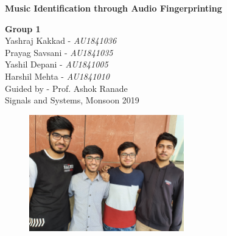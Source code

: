\begin{titlepage}
    \begin{center}
        \vspace*{1cm}
        
        \Huge
        \textbf{Music Identification through Audio Fingerprinting}
        
        \vspace{1cm}
        \LARGE
        \textbf{Group 1} \\
        \vspace*{3mm}
        Yashraj Kakkad - \textit{AU1841036} \\ 
        Prayag Savsani - \textit{AU1841035} \\
        Yashil Depani - \textit{AU1841005} \\ 
        Harshil Mehta - \textit{AU1841010} \\
        
        \vspace*{3mm}
        Guided by - Prof. Ashok Ranade \\
        Signals and Systems, Monsoon 2019
        \vspace*{1cm}
        \begin{figure}[h]
            \begin{center}
            \includegraphics[width=0.6\textwidth]{GroupPhoto.jpg}
            \end{center}
        \end{figure}

    \end{center}
\end{titlepage}
